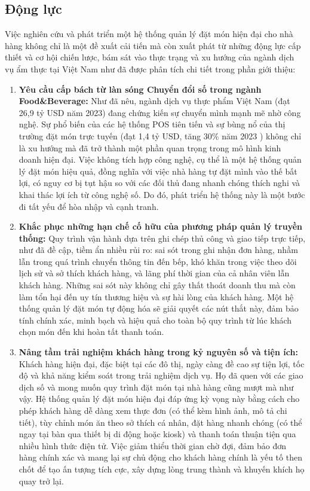 \subsection{Động lực}

Việc nghiên cứu và phát triển một hệ thống quản lý đặt món hiện đại cho nhà hàng không chỉ là một đề xuất cải tiến mà còn xuất phát từ những động lực cấp thiết và cơ hội chiến lược, bám sát vào thực trạng và xu hướng của ngành dịch vụ ẩm thực tại Việt Nam như đã được phân tích chi tiết trong phần giới thiệu:

\begin{enumerate}
    \item \textbf{Yêu cầu cấp bách từ làn sóng Chuyển đổi số trong ngành Food\&Beverage:} Như đã nêu, ngành dịch vụ thực phẩm Việt Nam (đạt 26,9 tỷ USD năm 2023) đang chứng kiến sự chuyển mình mạnh mẽ nhờ công nghệ. Sự phổ biến của các hệ thống POS tiên tiến và sự bùng nổ của thị trường đặt món trực tuyến (đạt 1,4 tỷ USD, tăng 30\% năm 2023 \cite{USDA}) không chỉ là xu hướng mà đã trở thành một phần quan trọng trong mô hình kinh doanh hiện đại. Việc không tích hợp công nghệ, cụ thể là một hệ thống quản lý đặt món hiệu quả, đồng nghĩa với việc nhà hàng tự đặt mình vào thế bất lợi, có nguy cơ bị tụt hậu so với các đối thủ đang nhanh chóng thích nghi và khai thác lợi ích từ công nghệ số. Do đó, phát triển hệ thống này là một bước đi tất yếu để hòa nhập và cạnh tranh.

    \item \textbf{Khắc phục những hạn chế cố hữu của phương pháp quản lý truyền thống:} Quy trình vận hành dựa trên ghi chép thủ công và giao tiếp trực tiếp, như đã đề cập, tiềm ẩn nhiều rủi ro: sai sót trong ghi nhận đơn hàng, nhầm lẫn trong quá trình chuyển thông tin đến bếp, khó khăn trong việc theo dõi lịch sử và sở thích khách hàng, và lãng phí thời gian của cả nhân viên lẫn khách hàng. Những sai sót này không chỉ gây thất thoát doanh thu mà còn làm tổn hại đến uy tín thương hiệu và sự hài lòng của khách hàng. Một hệ thống quản lý đặt món tự động hóa sẽ giải quyết các nút thắt này, đảm bảo tính chính xác, minh bạch và hiệu quả cho toàn bộ quy trình từ lúc khách chọn món đến khi hoàn tất thanh toán.

    \item \textbf{Nâng tầm trải nghiệm khách hàng trong kỷ nguyên số và tiện ích:} Khách hàng hiện đại, đặc biệt tại các đô thị, ngày càng đề cao sự tiện lợi, tốc độ và khả năng kiểm soát trong trải nghiệm dịch vụ. Họ đã quen với các giao dịch số và mong muốn quy trình đặt món tại nhà hàng cũng mượt mà như vậy. Hệ thống quản lý đặt món hiện đại đáp ứng kỳ vọng này bằng cách cho phép khách hàng dễ dàng xem thực đơn (có thể kèm hình ảnh, mô tả chi tiết), tùy chỉnh món ăn theo sở thích cá nhân, đặt hàng nhanh chóng (có thể ngay tại bàn qua thiết bị di động hoặc kiosk) và thanh toán thuận tiện qua nhiều hình thức điện tử. Việc giảm thiểu thời gian chờ đợi, đảm bảo đơn hàng chính xác và mang lại sự chủ động cho khách hàng chính là yếu tố then chốt để tạo ấn tượng tích cực, xây dựng lòng trung thành và khuyến khích họ quay trở lại.


\end{enumerate}
